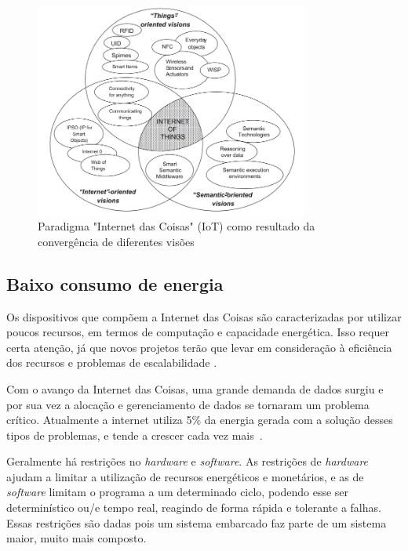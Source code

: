  \begin{figure}[H]
	\centering
    	\caption{\label{fig:iotoverview} Paradigma "Internet das Coisas" (IoT) como resultado da convergência de diferentes visões }
		\includegraphics[width = 0.8\textwidth]	{resources/iotoverview}
\end{figure}



\subsection{Baixo consumo de energia}

Os dispositivos que compõem a Internet das Coisas são caracterizadas por utilizar poucos recursos, em termos de computação e capacidade energética. Isso requer certa atenção, já que novos projetos terão que levar em consideração à eficiência dos recursos e problemas de escalabilidade \cite{atzori2010internet}.

Com o avanço da Internet das Coisas, uma grande demanda de dados surgiu e por sua vez a alocação e gerenciamento de dados se tornaram um problema crítico. Atualmente a internet utiliza 5\% da energia gerada com a solução desses tipos de problemas, e tende a crescer cada vez mais~\cite{Gubbi:2013}.

Geralmente há restrições no \textit{hardware} e \textit{software}. As restrições de \textit{hardware} ajudam a limitar a utilização de recursos energéticos e monetários, e as de \textit{software} limitam o programa a um determinado ciclo, podendo esse ser determinístico ou/e tempo real, reagindo de forma rápida e tolerante a falhas. Essas restrições são dadas pois um sistema embarcado faz parte de um sistema maior, muito mais composto. %

